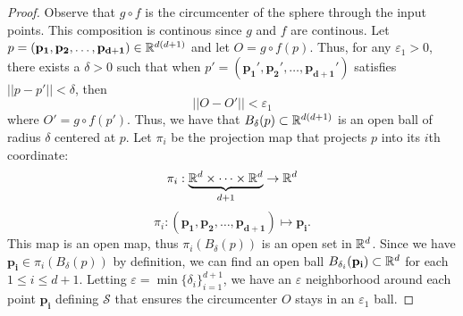 \documentclass[letterpaper,titlepage]{article}
\begin{document}
\begin{proof}
        Observe that $g \circ f$ is the circumcenter of the sphere through the input points. This composition is continous since $g$ and $f$ are continous. Let $p = (\mathbf{p_1},\mathbf{p_2},\dots,\mathbf{p_{d+1}}) \in \mathbb{R}^{d(d+1)}$ and let $O=g \circ f(p)$. Thus, for any $\varepsilon_1>0$, there exists a $\delta>0$ such that when $p'=(\mathbf{p_1}',\mathbf{p_2}',\dots,\mathbf{p_{d+1}}')$ satisfies $||p-p'|| < \delta$, then
        $$||O-O'|| < \varepsilon_1$$
        where $O'=g \circ f(p').$ Thus, we have that $B_\delta(p) \subset \mathbb{R}^{d(d+1)}$ is an open ball of radius $\delta$ centered at $p$. Let $\pi_i$ be the projection map that projects $p$ into its $i$th coordinate:
        $$\pi_i: \underbrace{\mathbb{R}^d \times \dots \times \mathbb{R}^d}_{d+1} \to \mathbb{R}^d$$
        $$\pi_i: (\mathbf{p_1},\mathbf{p_2},\dots,\mathbf{p_{d+1}}) \mapsto \mathbf{p_i}.$$
        This map is an open map, thus $\pi_i(B_\delta(p))$ is an open set in $\mathbb{R}^d$. Since we have $\mathbf{p_i} \in \pi_i(B_\delta(p))$ by definition, we can find an open ball $B_{\delta_i}(\mathbf{p_i}) \subset \mathbb{R}^d$ for each $1\leq i \leq d+1$. Letting $\varepsilon = \min\{\delta_i\}_{i=1}^{d+1}$, we have an $\varepsilon$ neighborhood around each point $\mathbf{p_i}$ defining $\mathcal{S}$ that ensures the circumcenter $O$ stays in an $\varepsilon_1$ ball.

    \end{proof}
    
\end{document}
